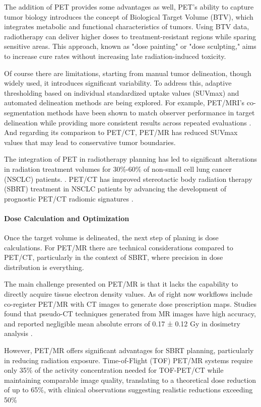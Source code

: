 \begin{multicols}{2}
The addition of PET provides some advantages as well, PET’s ability to capture tumor biology introduces the concept of Biological Target Volume (BTV), which integrates metabolic and functional characteristics of tumors. Using BTV data, radiotherapy can deliver higher doses to treatment-resistant regions while sparing sensitive areas. This approach, known as "dose painting" or "dose sculpting," aims to increase cure rates without increasing late radiation-induced toxicity. \cite{Schinagl2006}

Of course there are limitations, starting from manual tumor delineation, though widely used, it introduces significant variability. To address this, adaptive thresholding based on individual standardized uptake values (SUVmax) and automated delineation methods are being explored. For example, PET/MRI’s co-segmentation methods have been shown to match observer performance in target delineation while providing more consistent results across repeated evaluations \cite{yan2024}. And regarding its comparison to PET/CT, PET/MR has reduced SUVmax values that may lead to conservative tumor boundaries.

The integration of PET in radiotherapy planning has led to significant alterations in radiation treatment volumes for 30\%-60\% of non-small cell lung cancer (NSCLC) patients. \cite{Bradley2004}. PET/CT has improved stereotactic body radiation therapy (SBRT) treatment in NSCLC patients by advancing the development of prognostic PET/CT radiomic signatures \cite{Vijayakumar2022}.

\paragraph{Dose Calculation and Optimization}

Once the target volume is delineated, the next step of planing is dose calculations. For PET/MR there are technical considerations compared to PET/CT, particularly in the context of SBRT, where precision in dose distribution is everything.

The main challenge presented on PET/MR is that it lacks the capability to directly acquire tissue electron density values. As of right now workflows include co-register PET/MR with CT images to generate dose prescription maps. Studies found that pseudo-CT techniques generated from MR images have high accuracy, and reported negligible mean absolute errors of 0.17 ± 0.12 Gy in dosimetry analysis \cite{yan2024}.

However, PET/MR offers significant advantages for SBRT planning, particularly in reducing radiation exposure. Time-of-Flight (TOF) PET/MR systems require only 35\% of the activity concentration needed for TOF-PET/CT while maintaining comparable image quality, translating to a theoretical dose reduction of up to 65\%, with clinical observations suggesting realistic reductions exceeding 50\% \cite{Polan2023}%


\end{multicols}

